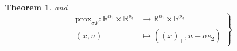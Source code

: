 \documentclass{article} %
\newtheorem{theorem}{Theorem} \newtheorem{lemma}[theorem]{Lemma}
\begin{document}
\begin{theorem}
  and
  \begin{equation}
    \left .
    \begin{split}
      \text{prox}_{\sigma F}: \mathbb{R}^{n_1} \times \mathbb{R}^{p_2} &\rightarrow \mathbb{R}^{n_1} \times \mathbb{R}^{p_2}\\
      (x, u) &\mapsto ((x)_+, u - \sigma e_2)
    \end{split}
    \right\}
  \end{equation}
  \label{thm:pd}
\end{theorem}

\end{document}
